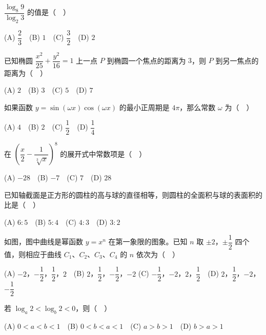 \begin{question}
\(\dfrac{\log_8 9}{\log_2 3}\) 的值是（　）

(A) \(\dfrac{2}{3}\)　(B) \(1\)　(C) \(\dfrac{3}{2}\)　(D) \(2\)

\end{question}
\begin{question}
已知椭圆 \(\dfrac{x^2}{25}+\dfrac{y^2}{16}=1\) 上一点 \(P\) 到椭圆一个焦点的距离为 \(3\)，则 \(P\) 到另一焦点的距离为（　）

(A) \(2\)　(B) \(3\)　(C) \(5\)　(D) \(7\)

\end{question}
\begin{question}
如果函数 \(y=\sin(\omega x)\cos(\omega x)\) 的最小正周期是 \(4\pi\)，那么常数 \(\omega\) 为（　）

(A) \(4\)　(B) \(2\)　(C) \(\dfrac{1}{2}\)　(D) \(\dfrac{1}{4}\)

\end{question}
\begin{question}
在 \(\left(\dfrac{x}{2}-\dfrac{1}{\sqrt[3]{x}}\right)^8\) 的展开式中常数项是（　）

(A) \(-28\)　(B) \(-7\)　(C) \(7\)　(D) \(28\)

\end{question}
\begin{question}
已知轴截面是正方形的圆柱的高与球的直径相等，则圆柱的全面积与球的表面积的比是（　）

(A) \(6:5\)　(B) \(5:4\)　(C) \(4:3\)　(D) \(3:2\)

\Needspace{0.4\textheight}
\end{question}
\begin{question}
如图，图中曲线是幂函数 \(y=x^n\) 在第一象限的图象。已知 \(n\) 取 \(\pm 2\)，\(\pm\dfrac{1}{2}\) 四个值，则相应于曲线 \(C_1\)、\(C_2\)、\(C_3\)、\(C_4\) 的 \(n\) 依次为（　）
\nopagebreak[4]
\begin{center}\end{center}
\nopagebreak[4]
(A) \(-2\)，\(-\dfrac{1}{2}\)，\(\dfrac{1}{2}\)，\(2\)　(B) \(2\)，\(\dfrac{1}{2}\)，\(-\dfrac{1}{2}\)，\(-2\)
(C) \(-\dfrac{1}{2}\)，\(-2\)，\(2\)，\(\dfrac{1}{2}\)　(D) \(2\)，\(\dfrac{1}{2}\)，\(-2\)，\(-\dfrac{1}{2}\)

\end{question}
\begin{question}
若 \(\log_a 2<\log_b 2<0\)，则（　）

(A) \(0<a<b<1\)　(B) \(0<b<a<1\)　(C) \(a>b>1\)　(D) \(b>a>1\)

\end{question}
